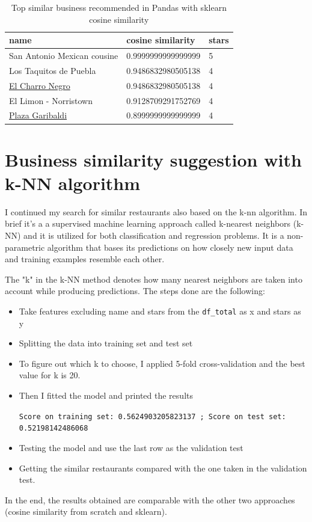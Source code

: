 \documentclass[12pt,english]{report}
\begin{document}
\begin{table}[]
\caption{Top similar business recommended in Pandas with sklearn cosine similarity}
\label{simrespandsklearn}
\begin{tabular}{|l|l|l|}
\hline
name                        & cosine similarity  & stars \\ \hline
San Antonio Mexican cousine & 0.9999999999999999 & 5     \\ \hline
Los Taquitos de Puebla      & 0.9486832980505138 & 4     \\ \hline
\href{https://www.yelp.com/biz/ecowas-african-restaurant-philadelphia-2}{El Charro Negro            } & 0.9486832980505138 & 4     \\ \hline
El Limon - Norristown       & 0.9128709291752769 & 4     \\ \hline
\href{https://www.yelp.com/biz/plaza-garibaldi-philadelphia-3?osq=Plaza+Garibaldi}{Plaza Garibaldi}             & 0.8999999999999999 & 4     \\ \hline
\end{tabular}
\end{table}
\section{Business similarity suggestion with k-NN algorithm}
I continued my search for similar restaurants also based on the k-nn algorithm. In brief it's a a supervised machine learning approach called k-nearest neighbors (k-NN) and it is utilized for both classification and regression problems. It is a non-parametric algorithm that bases its predictions on how closely new input data and training examples resemble each other. \par
The "k" in the k-NN method denotes how many nearest neighbors are taken into account while producing predictions.
The steps done are the following: 
\begin{itemize}
\item Take features excluding name and stars from the \texttt{df\_total} as x and stars as y
\item Splitting the data into training set and test set 
\item To figure out which k to choose, I applied 5-fold cross-validation and the best value for k is 20.
\item Then I fitted the model and printed the results \par
\texttt{Score on training set: 0.5624903205823137 ; Score on test set: 0.52198142486068}
\item Testing the model and use the last row as the validation test 
\item Getting the similar restaurants compared with the one taken in the validation test.
\end{itemize}
In the end, the results obtained are comparable with the other two approaches (cosine similarity from scratch and sklearn).
\end{document}
